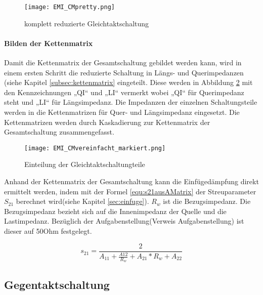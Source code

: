 \begin{figure}[H]
	\centering
	\texttt{[image: EMI\_CMpretty.png]}
	\caption{komplett reduzierte Gleichtaktschaltung}
	\label{fig:CMSchaltungvereinfacht}
\end{figure}

\paragraph{Bilden der Kettenmatrix}\label{para:kettenGleichtakt}
Damit die Kettenmatrix der Gesamtschaltung gebildet werden kann, wird in einem ersten Schritt die reduzierte Schaltung in Längs- und Querimpedanzen (siehe Kapitel \ref{subsec:kettenmatrix} eingeteilt. Diese werden in Abbildung \ref{fig:cmschaltungEingeteilt} mit den Kennzeichnungen „QI“ und „LI“ vermerkt wobei „QI“ für Querimpedanz steht und „LI“ für Längsimpedanz. Die Impedanzen der einzelnen Schaltungsteile werden in die Kettenmatrizen für Quer- und Längsimpedanz eingesetzt. Die Kettenmatrizen werden durch Kaskadierung zur Kettenmatrix der Gesamtschaltung zusammengefasst.
\begin{figure}[H]
		\centering
		\texttt{[image: EMI\_CMvereinfacht\_markiert.png]}
		\label{fig:cmschaltungEingeteilt}
		\caption{Einteilung der Gleichtaktschaltungteile}
\end{figure}
Anhand der Kettenmatrix der Gesamtschaltung kann die Einfügedämpfung direkt ermittelt werden, indem mit der Formel \ref{equ:s21ausAMatrix} der Streuparameter $S_{21}$ berechnet wird(siehe Kapitel \ref{sec:einfuge}). $R_w$ ist die Bezugsimpedanz. Die Bezugsimpedanz bezieht sich auf die Innenimpedanz der Quelle und die Lastimpedanz. Bezüglich der Aufgabenstellung(Verweis Aufgabenstellung) ist dieser auf 50Ohm festgelegt.

\begin{equation}\label{equ:s21ausAMatrix}
s_{21} = \frac{2}{A_{11}+\frac{A{12}}{R_w}+A_{21}*R_w+A_{22}}
\end{equation}


\subsection{Gegentaktschaltung}\label{subsec:zusammenfassungGegentakt}
